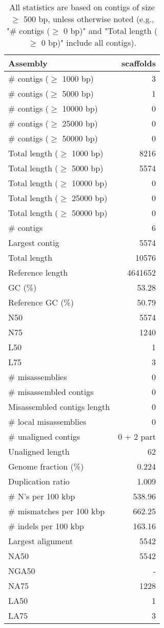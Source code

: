 \documentclass[12pt,a4paper]{article}
\begin{document}
\begin{table}[ht]
\begin{center}
\caption{All statistics are based on contigs of size $\geq$ 500 bp, unless otherwise noted (e.g., "\# contigs ($\geq$ 0 bp)" and "Total length ($\geq$ 0 bp)" include all contigs).}
\begin{tabular}{|l*{1}{|r}|}
\hline
Assembly & scaffolds \\ \hline
\# contigs ($\geq$ 1000 bp) & 3 \\ \hline
\# contigs ($\geq$ 5000 bp) & 1 \\ \hline
\# contigs ($\geq$ 10000 bp) & 0 \\ \hline
\# contigs ($\geq$ 25000 bp) & 0 \\ \hline
\# contigs ($\geq$ 50000 bp) & 0 \\ \hline
Total length ($\geq$ 1000 bp) & 8216 \\ \hline
Total length ($\geq$ 5000 bp) & 5574 \\ \hline
Total length ($\geq$ 10000 bp) & 0 \\ \hline
Total length ($\geq$ 25000 bp) & 0 \\ \hline
Total length ($\geq$ 50000 bp) & 0 \\ \hline
\# contigs & 6 \\ \hline
Largest contig & 5574 \\ \hline
Total length & 10576 \\ \hline
Reference length & 4641652 \\ \hline
GC (\%) & 53.28 \\ \hline
Reference GC (\%) & 50.79 \\ \hline
N50 & 5574 \\ \hline
N75 & 1240 \\ \hline
L50 & 1 \\ \hline
L75 & 3 \\ \hline
\# misassemblies & 0 \\ \hline
\# misassembled contigs & 0 \\ \hline
Misassembled contigs length & 0 \\ \hline
\# local misassemblies & 0 \\ \hline
\# unaligned contigs & 0 + 2 part \\ \hline
Unaligned length & 62 \\ \hline
Genome fraction (\%) & 0.224 \\ \hline
Duplication ratio & 1.009 \\ \hline
\# N's per 100 kbp & 538.96 \\ \hline
\# mismatches per 100 kbp & 662.25 \\ \hline
\# indels per 100 kbp & 163.16 \\ \hline
Largest alignment & 5542 \\ \hline
NA50 & 5542 \\ \hline
NGA50 & - \\ \hline
NA75 & 1228 \\ \hline
LA50 & 1 \\ \hline
LA75 & 3 \\ \hline
\end{tabular}
\end{center}
\end{table}
\end{document}
